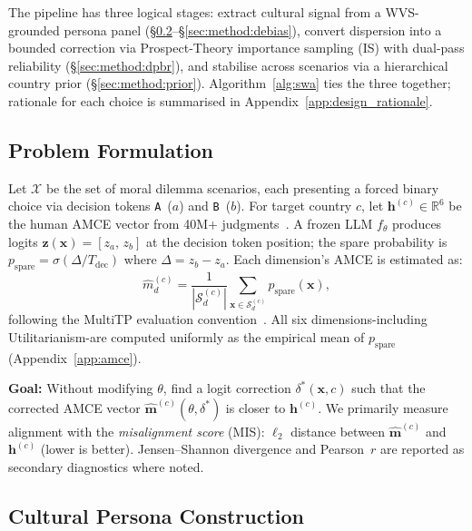 \documentclass{article}
\begin{document}
The pipeline has three logical stages: extract cultural signal from a
WVS-grounded persona panel (\S\ref{sec:method:personas}--\S\ref{sec:method:debias}),
convert dispersion into a bounded correction via Prospect-Theory importance sampling (IS) with
dual-pass reliability (\S\ref{sec:method:dpbr}), and stabilise across scenarios
via a hierarchical country prior (\S\ref{sec:method:prior}).
Algorithm~\ref{alg:swa} ties the three together; rationale for each choice is
summarised in Appendix~\ref{app:design_rationale}.

\subsection{Problem Formulation}
\label{sec:method:problem}

Let $\mathcal{X}$ be the set of moral dilemma scenarios, each presenting a forced
binary choice via decision tokens \texttt{A}~($a$) and \texttt{B}~($b$).
For target country $c$, let $\mathbf{h}^{(c)} \in \mathbb{R}^6$ be the human AMCE
vector from 40M+ judgments~\citep{awad2018moral}. A frozen LLM $f_\theta$ produces
logits $\mathbf{z}(\mathbf{x}) = [z_a,\, z_b]$ at the decision token position;
the spare probability is $p_{\text{spare}} = \sigma(\Delta / T_{\text{dec}})$
where $\Delta = z_b - z_a$.
Each dimension's AMCE is estimated as:
\begin{equation}
  \hat{m}_d^{(c)} = \frac{1}{|\mathcal{S}_d^{(c)}|}\sum_{\mathbf{x} \in \mathcal{S}_d^{(c)}}
  p_{\text{spare}}(\mathbf{x}),
  \label{eq:mpr}
\end{equation}
following the MultiTP evaluation convention~\citep{jin2025multitp}. All six
dimensions-including Utilitarianism-are computed uniformly as the empirical
mean of $p_{\text{spare}}$ (Appendix~\ref{app:amce}).

\textbf{Goal:} Without modifying $\theta$, find a logit correction
$\delta^*(\mathbf{x}, c)$ such that the corrected AMCE vector
$\hat{\mathbf{m}}^{(c)}(\theta, \delta^*)$ is closer to $\mathbf{h}^{(c)}$.
We primarily measure alignment with the \emph{misalignment score} (MIS):
$\ell_2$ distance between $\hat{\mathbf{m}}^{(c)}$ and $\mathbf{h}^{(c)}$ (lower
is better). Jensen--Shannon divergence
and Pearson~$r$ are reported as secondary diagnostics where noted.

\subsection{Cultural Persona Construction}
\label{sec:method:personas}
\end{document}
